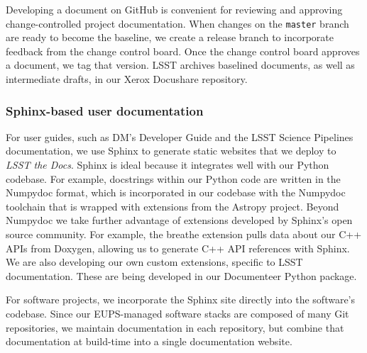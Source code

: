 Developing a document on GitHub is convenient for reviewing and approving change-controlled project documentation.
When changes on the \texttt{master} branch are ready to become the baseline, we create a release branch to incorporate feedback from the change control board.
Once the change control board approves a document, we tag that version.
LSST archives baselined documents, as well as intermediate drafts, in our Xerox Docushare repository.

\subsubsection{Sphinx-based user documentation}
\label{sec:sphinx_tooling}

For user guides, such as DM's Developer Guide and the LSST Science Pipelines documentation, we use Sphinx to generate static websites that we deploy to \textit{LSST the Docs}.
Sphinx is ideal because it integrates well with our Python codebase.
For example, docstrings within our Python code are written in the Numpydoc\cite{numpydoc} format, which is incorporated in our codebase with the Numpydoc toolchain that is wrapped with extensions from the Astropy\cite{2018arXiv180102634T} project.
Beyond Numpydoc we take further advantage of extensions developed by Sphinx's open source community.
For example, the breathe extension pulls data about our C++ APIs from Doxygen, allowing us to generate C++ API references with Sphinx.
We are also developing our own custom extensions, specific to LSST documentation.
These are being developed in our Documenteer Python package.

For software projects, we incorporate the Sphinx site directly into the software's codebase.
Since our EUPS-managed software stacks are composed of many Git repositories, we maintain documentation in each repository, but combine that documentation at build-time into a single documentation website.
